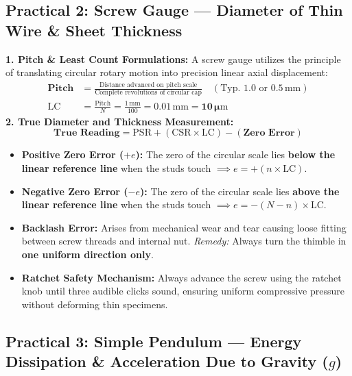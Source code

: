 \documentclass[10pt,twoside,openright]{book}
\begin{document}
\subsection{Practical 2: Screw Gauge --- Diameter of Thin Wire \& Sheet Thickness}

\begin{formulabox}
\textbf{1. Pitch \& Least Count Formulations:}
A screw gauge utilizes the principle of translating circular rotary motion into precision linear axial displacement:
\begin{align}
  \mathbf{\text{Pitch}} &= \frac{\text{Distance advanced on pitch scale}}{\text{Complete revolutions of circular cap}} \quad (\text{Typ. } 1.0\text{ or } 0.5\,\mathrm{mm}) \\
  \mathbf{\mathrm{LC}} &= \frac{\text{Pitch}}{N} = \frac{1\,\mathrm{mm}}{100} = \mathbf{0.01\,\mathrm{mm} = 10\,\mu\mathrm{m}}
\end{align}
\textbf{2. True Diameter and Thickness Measurement:}
\begin{equation}
  \mathbf{\text{True Reading} = \mathrm{PSR} + (\mathrm{CSR} \times \mathrm{LC}) - (\text{Zero Error})}
\end{equation}
\begin{itemize}
  \item \textbf{Positive Zero Error ($+e$):} The zero of the circular scale lies \textbf{below the linear reference line} when the studs touch $\implies e = +(n \times \mathrm{LC})$.
  \item \textbf{Negative Zero Error ($-e$):} The zero of the circular scale lies \textbf{above the linear reference line} when the studs touch $\implies e = -(N - n)\times \mathrm{LC}$.
  \item \textbf{Backlash Error:} Arises from mechanical wear and tear causing loose fitting between screw threads and internal nut. \textit{Remedy:} Always turn the thimble in \textbf{one uniform direction only}.
  \item \textbf{Ratchet Safety Mechanism:} Always advance the screw using the ratchet knob until three audible clicks sound, ensuring uniform compressive pressure without deforming thin specimens.
\end{itemize}
\end{formulabox}

\subsection{Practical 3: Simple Pendulum --- Energy Dissipation \& Acceleration Due to Gravity ($g$)}
\end{document}
